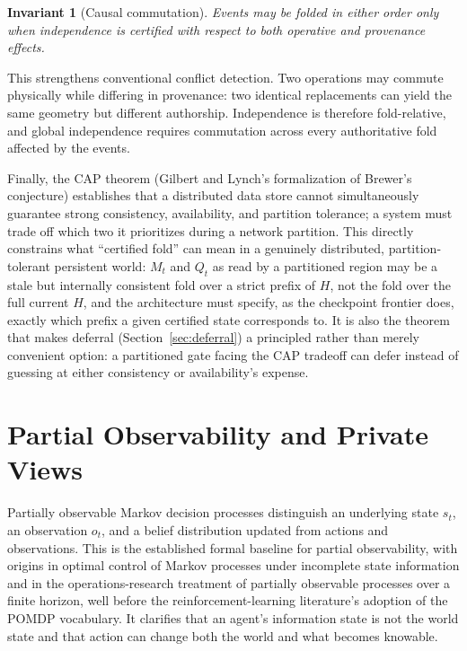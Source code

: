 \documentclass[11pt]{article}
\newtheorem{invariant}{Invariant}
\begin{document}
\begin{invariant}[Causal commutation]
\label{inv:causal-commutation}
Events may be folded in either order only when independence is certified with respect to both operative and provenance effects.
\end{invariant}

This strengthens conventional conflict detection. Two operations may commute physically while differing in provenance: two identical replacements can yield the same geometry but different authorship. Independence is therefore fold-relative, and global independence requires commutation across every authoritative fold affected by the events.

Finally, the CAP theorem (Gilbert and Lynch's formalization of Brewer's conjecture) establishes that a distributed data store cannot simultaneously guarantee strong consistency, availability, and partition tolerance; a system must trade off which two it prioritizes during a network partition. This directly constrains what ``certified fold'' can mean in a genuinely distributed, partition-tolerant persistent world: $M_t$ and $Q_t$ as read by a partitioned region may be a stale but internally consistent fold over a strict prefix of $H$, not the fold over the full current $H$, and the architecture must specify, as the checkpoint frontier does, exactly which prefix a given certified state corresponds to. It is also the theorem that makes deferral (Section~\ref{sec:deferral}) a principled rather than merely convenient option: a partitioned gate facing the CAP tradeoff can defer instead of guessing at either consistency or availability's expense.

\section{Partial Observability and Private Views}
\label{sec:pomdp}

Partially observable Markov decision processes distinguish an underlying state $s_t$, an observation $o_t$, and a belief distribution updated from actions and observations. This is the established formal baseline for partial observability, with origins in optimal control of Markov processes under incomplete state information and in the operations-research treatment of partially observable processes over a finite horizon, well before the reinforcement-learning literature's adoption of the POMDP vocabulary. It clarifies that an agent's information state is not the world state and that action can change both the world and what becomes knowable.
\end{document}
